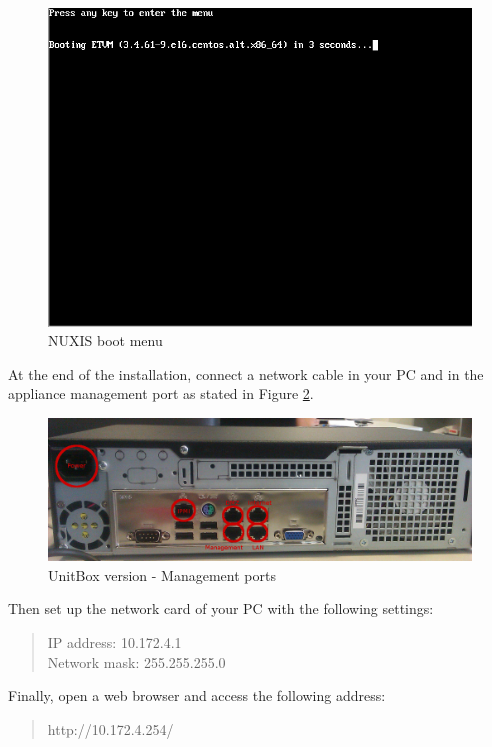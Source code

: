 \begin{figure}[H]
	\begin{center}
	\includegraphics[scale=0.4]{screenshots/install/unitbox/pos_install_bootmenu.png}
	\caption{NUXIS boot menu}
	\label{fig:boot_screen_standard}
	\end{center}
\end{figure}

At the end of the installation, connect a network cable in your PC and in the appliance management port as stated in Figure \ref{fig:back_standard}.

\begin{figure}[H]
	\begin{center}
	\includegraphics[scale=0.30]{screenshots/appliance_back_g3.jpg}
	\caption{UnitBox version - Management ports}
	\label{fig:back_standard}
	\end{center}
\end{figure}

Then set up the network card of your PC with the following settings:

\begin{quote}
IP address: 10.172.4.1\\
Network mask: 255.255.255.0
\end{quote}

Finally, open a web browser and access the following address:
\begin{quote}
http://10.172.4.254/
\end{quote}

\pagebreak
